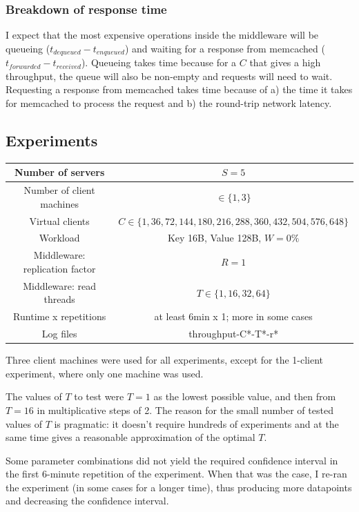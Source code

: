 \documentclass[11pt]{article}
\begin{document}
\subsubsection{Breakdown of response time}
I expect that the most expensive operations inside the middleware will be queueing ($t_{dequeued}-t_{enqueued}$) and waiting for a response from memcached ($t_{forwarded}-t_{received}$). Queueing takes time because for a $C$ that gives a high throughput, the queue will also be non-empty and requests will need to wait. Requesting a response from memcached takes time because of a) the time it takes for memcached to process the request and b) the round-trip network latency.

\subsection{Experiments}
\begin{center}
\small{
\smallskip
\begin{tabular}{|c|c|}
\hline Number of servers & $S=5$ \\ 
\hline Number of client machines & $\in \{1, 3\}$ \\ 
\hline Virtual clients & $C \in \{1, 36, 72, 144, 180, 216, 288, 360, 432, 504, 576, 648\}$ \\ 
\hline Workload & Key 16B, Value 128B, $W=0\%$ \\
\hline Middleware: replication factor & $R=1$ \\ 
\hline Middleware: read threads & $T \in\{1, 16, 32, 64\}$ \\ 
\hline Runtime x repetitions & at least 6min x 1; more in some cases \\ 
\hline Log files & throughput-C*-T*-r* \\
\hline 
\end{tabular} }
\end{center}

Three client machines were used for all experiments, except for the 1-client experiment, where only one machine was used.

The values of $T$ to test were $T=1$ as the lowest possible value, and then from $T=16$ in multiplicative steps of 2. The reason for the small number of tested values of $T$ is pragmatic: it doesn't require hundreds of experiments and at the same time gives a reasonable approximation of the optimal $T$.

Some parameter combinations did not yield the required confidence interval in the first 6-minute repetition of the experiment. When that was the case, I re-ran the experiment (in some cases for a longer time), thus producing more datapoints and decreasing the confidence interval.
\end{document}

